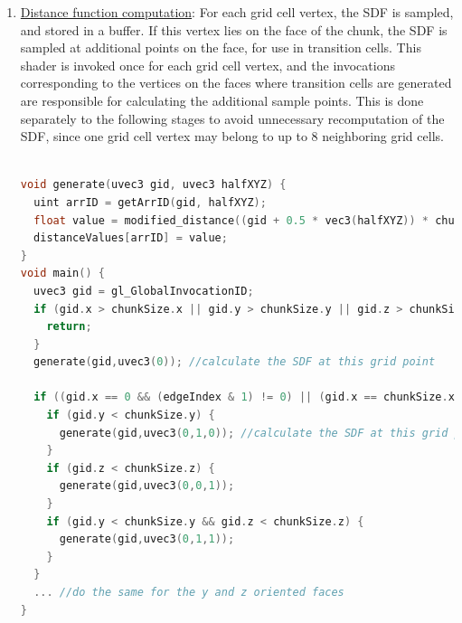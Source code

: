 \documentclass[11pt]{article}
\begin{document}
\begin{enumerate}
\item \underline{Distance function computation}: For each grid cell vertex, the SDF is sampled, and stored in a buffer. If this vertex lies on the face of the chunk, the SDF is sampled at additional points on the face, for use in transition cells. This shader is invoked once for each grid cell vertex, and the invocations corresponding to the vertices on the faces where transition cells are generated are responsible for calculating the additional sample points. This is done separately to the following stages to avoid unnecessary recomputation of the SDF, since one grid cell vertex may belong to up to 8 neighboring grid cells.

\begin{lstlisting}[language=C++,label={tv_generate},caption={Code snippet that samples the SDF at the grid point, as well as at the points needed for any transition cells on the -X and +X facing faces. The \texttt{generate} function is responsible for sampling the SDF and storing the value in a buffer, and takes 2 parameters: the first is the actual position of the grid cell vertex, and the second is an offset parameter, for generating sample values halfway beetween grid vertices. For example, a value of \texttt{uvec3(0,1,0)} corresponds to a point that is offset from the position in the first argument by half a grid cell in the Y direction.}]

void generate(uvec3 gid, uvec3 halfXYZ) {
  uint arrID = getArrID(gid, halfXYZ);
  float value = modified_distance((gid + 0.5 * vec3(halfXYZ)) * chunkStride + chunkPosition);
  distanceValues[arrID] = value;
}
void main() {
  uvec3 gid = gl_GlobalInvocationID;
  if (gid.x > chunkSize.x || gid.y > chunkSize.y || gid.z > chunkSize.z) {
    return;
  }
  generate(gid,uvec3(0)); //calculate the SDF at this grid point

  if ((gid.x == 0 && (edgeIndex & 1) != 0) || (gid.x == chunkSize.x && (edgeIndex & 2) != 0)) {
    if (gid.y < chunkSize.y) {
      generate(gid,uvec3(0,1,0)); //calculate the SDF at this grid point, offset by half the grid width in the y direction
    }
    if (gid.z < chunkSize.z) {
      generate(gid,uvec3(0,0,1));
    }
    if (gid.y < chunkSize.y && gid.z < chunkSize.z) {
      generate(gid,uvec3(0,1,1));
    }
  }
  ... //do the same for the y and z oriented faces  
}
\end{lstlisting}


\end{enumerate}
\end{document}
